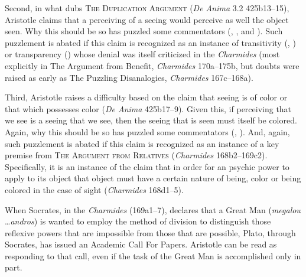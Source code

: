 Second, in what \citet{caston02} dubs \textsc{The Duplication Argument} (\emph{De Anima} 3.2 425b13–15), Aristotle claims that a perceiving of a seeing would perceive as well the object seen. Why this should be so has puzzled some commentators (\citealt[435]{Hicks:1907uq}, \citealt[121–2]{Hamlyn:2002ys}, and \citealt[44–5]{Kosman:2014ab}). Such puzzlement is abated if this claim is recognized as an instance of transitivity (\citealt{McCabe:2007ss}, \citealt{McCabe:2007jb}) or transparency (\citealt{Tsouna:2022aa}) whose denial was itself criticized in the \emph{Charmides} (most explicitly in The Argument from Benefit, \emph{Charmides} 170a–175b, but doubts were raised as early as The Puzzling Disanalogies, \emph{Charmides} 167c–168a).

Third, Aristotle raises a difficulty based on the claim that seeing is of color or that which possesses color (\emph{De Anima} 425b17–9). Given this, if perceiving that we see is a seeing that we see, then the seeing that is seen must itself be colored. Again, why this should be so has puzzled some commentators (\citealt[122]{Hamlyn:2002ys}, \citealt[45–6]{Kosman:2014ab}). And, again, such puzzlement is abated if this claim is recognized as an instance of a key premise from \textsc{The Argument from Relatives} (\emph{Charmides} 168b2–169c2). Specifically, it is an instance of the claim that in order for an psychic power to apply to its object that object must have a certain nature of being, color or being colored in the case of sight (\emph{Charmides} 168d1–5).

When Socrates, in the \emph{Charmides} (169a1–7), declares that a Great Man (\emph{megalou} \ldots \emph{andros}) is wanted to employ the method of division to distinguish those reflexive powers that are impossible from those that are possible, Plato, through Socrates, has issued an Academic Call For Papers. Aristotle can be read as responding to that call, even if the task of the Great Man is accomplished only in part. 

